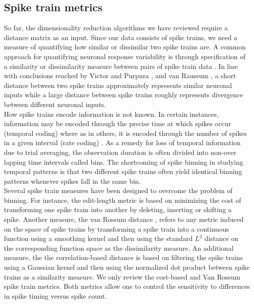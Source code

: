 
\subsection{Spike train metrics}
So far, the dimensionality reduction algorithms we have reviewed require a distance matrix
as an input. Since our data consists of spike trains, we need a measure of quantifying how 
similar or dissimilar two spike trains are.
A common approach for quantifying neuronal response variability is through specification of a  similarity or dissimilarity measure between pairs of spike train data \cite{Brown2004, Victor1996, Victor1998,Rossum2001,houghton2010measuring}. In line with conclusions reached by Victor and Purpura \cite{Victor1996, Victor1998}, and van Raussum \cite{Rossum2001}, a short distance between two spike trains approximately represents similar neuronal inputs while a large distance between spike trains roughly represents divergence between different neuronal inputs.\\

How spike trains encode information is not known. In certain instances, information may be encoded through the precise time at which spikes occur (temporal coding) where as in others, it is encoded through the number of spikes in a given interval (rate coding) \cite{Abbott2001}.
As a remedy for loss of temporal information due to trial averaging, the observation duration is often divided into non-over lapping time intervals called bins. The shortcoming of spike binning in studying temporal patterns is that two different spike trains often yield identical binning patterns whenever spikes fall in the same bin.\\

Several spike train measures have been designed to overcome the problem of binning. For instance, the edit-length metric \cite{Victor1996, Victor1998} is based on minimizing the cost of transforming one spike train into another by deleting, inserting or shifting a spike. Another measure, the van Rossum distance \cite{Rossum2001,houghton2010measuring}, refers to any metric induced on the space of spike trains by transforming a spike train into a continuous function using a smoothing kernel and then using the standard $L^2$ distance on the corresponding function space as the dissimilarity measure. An additional measure, the the correlation-based distance \cite{Schreiber2003} is based on filtering the spike trains using a Gaussian kernel and then using the normalized dot product between  spike trains as a  similarity measure.
We only review the cost-based and Van Rossum spike train metrics. Both metrics allow one to control the sensitivity to differences in spike timing versus spike count.

